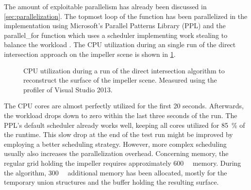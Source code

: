 The amount of exploitable parallelism has already been discussed in \cref{sec:parallelization}.
The topmost loop of the  function has been parallelized in the implementation using Microsoft's Parallel Patterns Library (PPL) and the parallel\_for function which uses a scheduler implementing work stealing to balance the workload \cite{ppl_parallel_for}.
The CPU utilization during an single run of the direct intersection approach on the impeller scene is shown in \cref{fig:di_cpu}.
%
\begin{figure}[!]
	\centering
	\caption{
		CPU utilization during a run of the direct intersection algorithm to reconstruct the surface of the impeller scene.
		Measured using the profiler of Visual Studio 2013.
	}
	\label{fig:di_cpu}
\end{figure}
%
The CPU cores are almost perfectly utilized for the first 20 seconds.
Afterwards, the workload drops down to zero within the last three seconds of the run.
The PPL's default scheduler already works well, keeping all cores utilized for \SI{85}{\percent} of the runtime.
This slow drop at the end of the test run might be improved by employing a better scheduling strategy.
However, more complex scheduling usually also increases the parallelization overhead.
%
Concerning memory, the regular grid holding the impeller requires approximately \SI{600}{\mebi\byte} memory.
During the algorithm, \SI{300}{\mebi\byte} additional memory has been allocated, mostly for the temporary union structures and the buffer holding the resulting surface.

